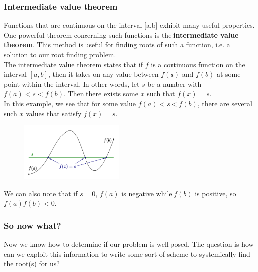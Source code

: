 \documentclass{if-beamer}
\begin{document}
\begin{frame}
\frametitle{Intermediate value theorem}
Functions that are continuous on the interval [a,b] exhibit many useful properties. One powerful theorem concerning such functions is the \textbf{intermediate value theorem}. This method is useful for finding roots of such a function, i.e. a solution to our root finding problem. \\\vspace{5pt} 
The intermediate value theorem states that if $f$ is a continuous function
on the interval $[a,b]$,  then it takes on any value between
$f(a)$ and $f(b)$ at some point within the interval. In other words,
let $s$ be a number with $f(a) < s < f(b)$. Then there exists some
$x$ such that $f(x) = s$. \\
\vspace{10pt}
In this example, we see that for some value $f(a) < s < f(b)$, there are several such $x$ values that satisfy $f(x) = s$.
\begin{figure}
	\center
	\includegraphics[width=0.45\textwidth]{figures/ivt.png}
\end{figure}
We can also note that if $s=0$, $f(a)$ is negative while $f(b)$ is positive, so $f(a)f(b)<0.$
\end{frame}


\begin{frame}
\frametitle{So now what?}
Now we know how to determine if our problem is well-posed. The question is how can we exploit this information to write some sort of scheme to systemically find the root(s) for us?
\end{frame}
\end{document}

